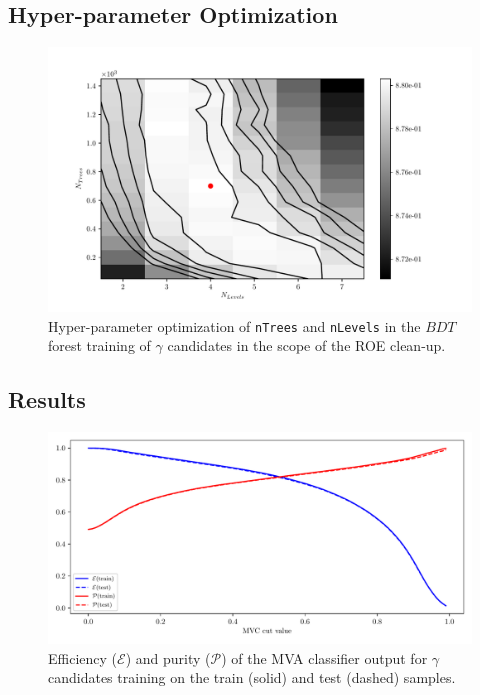 \subsection{Hyper-parameter Optimization}

\begin{figure}[H]
\centering
\captionsetup{width=0.8\linewidth}
\includegraphics[width=\linewidth]{fig/addendums/gamma_hpo}
\caption{Hyper-parameter optimization of \texttt{\footnotesize nTrees} and \texttt{\footnotesize nLevels} in the $BDT$ forest training of $\gamma$ candidates in the scope of the ROE clean-up.}
\end{figure}

\subsection{Results}

\begin{figure}[H]
\centering
\captionsetup{width=0.8\linewidth}
\includegraphics[width=\linewidth]{fig/addendums/gamma_effpur}
\caption{Efficiency ($\mathcal{E}$) and purity ($\mathcal{P}$) of the MVA classifier output for $\gamma$ candidates training on the train (solid) and test (dashed) samples.}
\end{figure}

